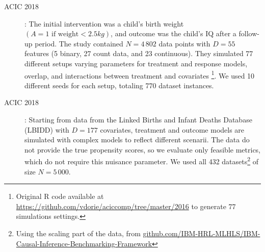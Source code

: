 \documentclass[10pt,twocolumn]{article}
\begin{document}
\begin{description}
    \item[ACIC 2018] \cite{dorie_automated_2019}:  The initial intervention was a child’s birth
        weight $(A = 1 \text{ if weight} < 2.5 kg)$, and outcome was the child’s
        IQ after a follow-up period. The study contained $N=4\,802$ data
        points with $D=55$ features (5 binary, 27 count data, and 23
        continuous). They simulated 77 different setups varying parameters
        for treatment and response models, overlap, and interactions between treatment and
        covariates \footnote{Original R code available at
            \url{https://github.com/vdorie/aciccomp/tree/master/2016}
            to generate 77 simulations settings.}. We used 10 different seeds
        for each setup, totaling 770 dataset instances.

    \item[ACIC 2018] \cite{shimoni_benchmarking_2018}: Starting from data from
        the Linked Births and Infant Deaths Database (LBIDD)
        \cite{macdorman_infant_1998} with $D=177$ covariates, treatment and
        outcome models are simulated with complex models to reflect different
        scenarii. The data do not provide the true propensity scores, so we
        evaluate only feasible metrics, which do not require this nuisance
        parameter. We used all 432 datasets\footnote{Using the scaling part of
            the data, from
            \href{https://github.com/IBM-HRL-MLHLS/IBM-Causal-Inference-Benchmarking-Framework}{github.com/IBM-HRL-MLHLS/IBM-Causal-Inference-Benchmarking-Framework}}
        of size $N=5\,000$.



\end{description}
\end{document}
